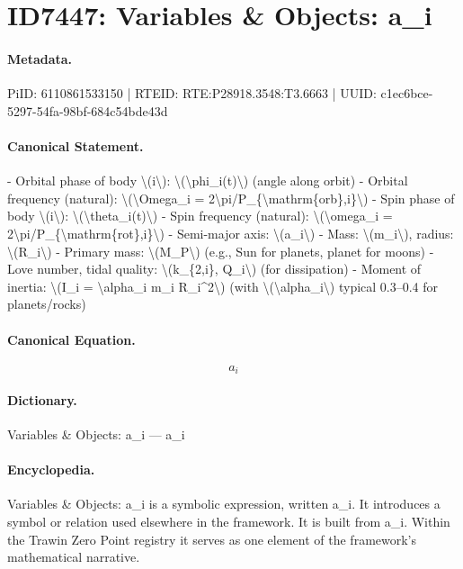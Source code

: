 \section*{ID7447: Variables \& Objects: a\_i}
\paragraph{Metadata.}
PiID: 6110861533150 | RTEID: RTE:P28918.3548:T3.6663 | UUID: c1ec6bce-5297-54fa-98bf-684c54bde43d

\paragraph{Canonical Statement.}
- Orbital phase of body \textbackslash{}(i\textbackslash{}): \textbackslash{}(\textbackslash{}phi\_i(t)\textbackslash{}) (angle along orbit) - Orbital frequency (natural): \textbackslash{}(\textbackslash{}Omega\_i = 2\textbackslash{}pi/P\_\{\textbackslash{}mathrm\{orb\},i\}\textbackslash{}) - Spin phase of body \textbackslash{}(i\textbackslash{}): \textbackslash{}(\textbackslash{}theta\_i(t)\textbackslash{}) - Spin frequency (natural): \textbackslash{}(\textbackslash{}omega\_i = 2\textbackslash{}pi/P\_\{\textbackslash{}mathrm\{rot\},i\}\textbackslash{}) - Semi-major axis: \textbackslash{}(a\_i\textbackslash{}) - Mass: \textbackslash{}(m\_i\textbackslash{}), radius: \textbackslash{}(R\_i\textbackslash{}) - Primary mass: \textbackslash{}(M\_P\textbackslash{}) (e.g., Sun for planets, planet for moons) - Love number, tidal quality: \textbackslash{}(k\_\{2,i\}, Q\_i\textbackslash{}) (for dissipation) - Moment of inertia: \textbackslash{}(I\_i = \textbackslash{}alpha\_i m\_i R\_i\textasciicircum{}2\textbackslash{}) (with \textbackslash{}(\textbackslash{}alpha\_i\textbackslash{}) typical 0.3–0.4 for planets/rocks)

\paragraph{Canonical Equation.}
\[
a_i
\]

\paragraph{Dictionary.}
Variables \& Objects: a\_i — a\_i

\paragraph{Encyclopedia.}
Variables \& Objects: a\_i is a symbolic expression, written a\_i. It introduces a symbol or relation used elsewhere in the framework. It is built from a\_i. Within the Trawin Zero Point registry it serves as one element of the framework's mathematical narrative.
